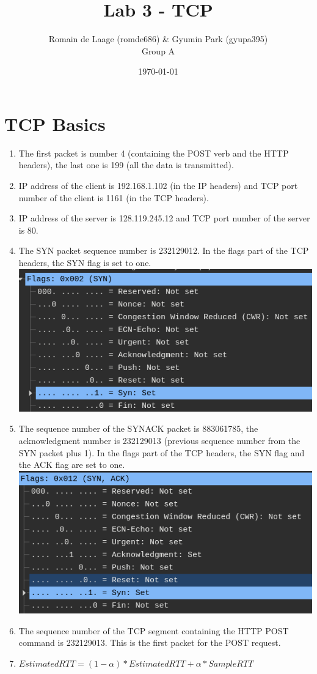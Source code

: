 \documentclass[a4paper,11pt,final]{report}
\title{Lab 3 - TCP}
\author{Romain de Laage (romde686) \& Gyumin Park (gyupa395)\\Group A}
\date{\today}
\begin{document}
\maketitle

\chapter{TCP Basics}

\begin{enumerate}
\def\labelenumi{\arabic{enumi}.}
\item
  The first packet is number 4 (containing the POST verb and the HTTP
  headers), the last one is 199 (all the data is transmitted).
\item
  IP address of the client is 192.168.1.102 (in the IP headers) and TCP
  port number of the client is 1161 (in the TCP headers).
\item
  IP address of the server is 128.119.245.12 and TCP port number of the
  server is 80.
\item
  The SYN packet sequence number is 232129012. In the flags part of the
  TCP headers, the SYN flag is set to one.\\
  \includegraphics[width=0.7\linewidth]{upload_79bade8fe3ddf5c050bf59195e0e77e9.png}
\item
  The sequence number of the SYNACK packet is 883061785, the
  acknowledgment number is 232129013 (previous sequence number from the
  SYN packet plus 1). In the flags part of the TCP headers, the SYN flag
  and the ACK flag are set to one.\\
  \includegraphics[width=0.7\linewidth]{upload_916fffa2f848e879e7481d83eff1193a.png}
\item
  The sequence number of the TCP segment containing the HTTP POST
  command is 232129013. This is the first packet for the POST request.
\item
  \(Estimated RTT = (1- \alpha) * Estimated RTT + \alpha * Sample RTT\)
\end{enumerate}
\end{document}
